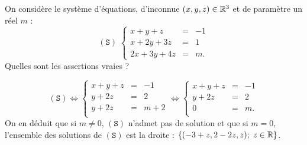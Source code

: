 \begin{question}
On considère le système d'équations, d'inconnue $(x,y,z)\in \mathbb{R}^3$ et de paramètre un réel $m$ :
$$(\mathtt{S}) \; \left\{\begin{array}{rcc}
x+y+z&=&-1\\
x+2y+3z&=&1\\
2x+3y+4z&=&m.\end{array}\right.$$
Quelles sont les assertions vraies ?
\begin{answers}  
\end{answers}
\begin{explanations} 
$$(\mathtt{S}) \Leftrightarrow  
\left\{\begin{array}{rcc}
x+y+z&=&-1\\
y+2z&=&2\\ 
y+2z&=&m+2\\ 
\end{array}\right. \Leftrightarrow  
\left\{\begin{array}{rcc}
x+y+z&=&-1\\
y+2z&=&2\\ 
0&=&m.\\ 
\end{array}\right.$$
On en déduit que si $m\neq 0$, $(\mathtt{S})$ n'admet pas de solution et que si $m=0$, l'ensemble des solutions de 
$(\mathtt{S})$ est la droite :
$\{(-3+z,2-2z,z); \; z\in \mathbb{R}\}$.
\end{explanations}
\end{question}

